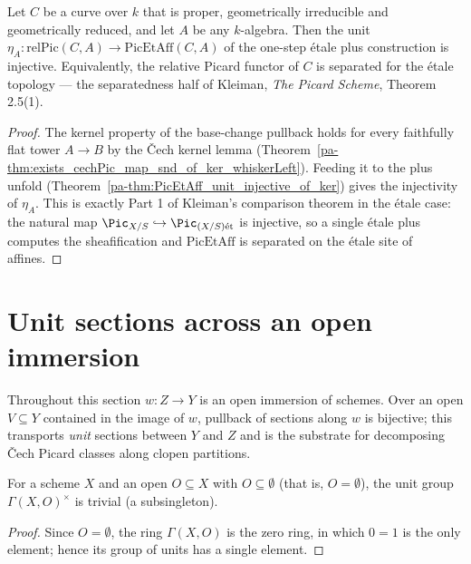 \begin{theorem}
  \label{pa-thm:PicEtAff_unit_injective}
  \leanok

  Let \(C\) be a curve over \(k\) that is proper, geometrically irreducible and geometrically
  reduced, and let \(A\) be any \(k\)-algebra.  Then the unit \(\eta_A \colon
  \mathrm{relPic}(C,A) \to \mathrm{PicEtAff}(C,A)\) of the one-step \'etale plus construction is
  injective.  Equivalently, the relative Picard functor of \(C\) is separated for the \'etale
  topology — the separatedness half of Kleiman, \emph{The Picard Scheme}, Theorem 2.5(1).
\end{theorem}
\begin{proof}
  \leanok
  The kernel property of the base-change pullback holds for every faithfully flat tower \(A \to
  B\) by the \v Cech kernel lemma
  (Theorem~\ref{pa-thm:exists_cechPic_map_snd_of_ker_whiskerLeft}).  Feeding it to the plus unfold
  (Theorem~\ref{pa-thm:PicEtAff_unit_injective_of_ker}) gives the injectivity of \(\eta_A\).  This
  is exactly Part 1 of Kleiman's comparison theorem in the \'etale case: the natural map
  \(\Pic_{X/S} \hookrightarrow \Pic_{(X/S)\mathrm{\acute et}}\) is injective, so a single
  \'etale plus computes the sheafification and \(\mathrm{PicEtAff}\) is separated on the \'etale
  site of affines.
\end{proof}


\section{Unit sections across an open immersion}

Throughout this section \(w \colon Z \to Y\) is an open immersion of schemes. Over an open
\(V \subseteq Y\) contained in the image of \(w\), pullback of sections along \(w\) is
bijective; this transports \emph{unit} sections between \(Y\) and \(Z\) and is the substrate
for decomposing \v Cech Picard classes along clopen partitions.

\begin{lemma}
  \label{pa-lem:subsingleton_units_empty}
  \leanok

  For a scheme \(X\) and an open \(O \subseteq X\) with \(O \subseteq \emptyset\) (that is,
  \(O = \emptyset\)), the unit group \(\Gamma(X, O)^{\times}\) is trivial (a subsingleton).
\end{lemma}
\begin{proof}
  \leanok
  Since \(O = \emptyset\), the ring \(\Gamma(X, O)\) is the zero ring, in which \(0 = 1\) is the
  only element; hence its group of units has a single element.
\end{proof}

